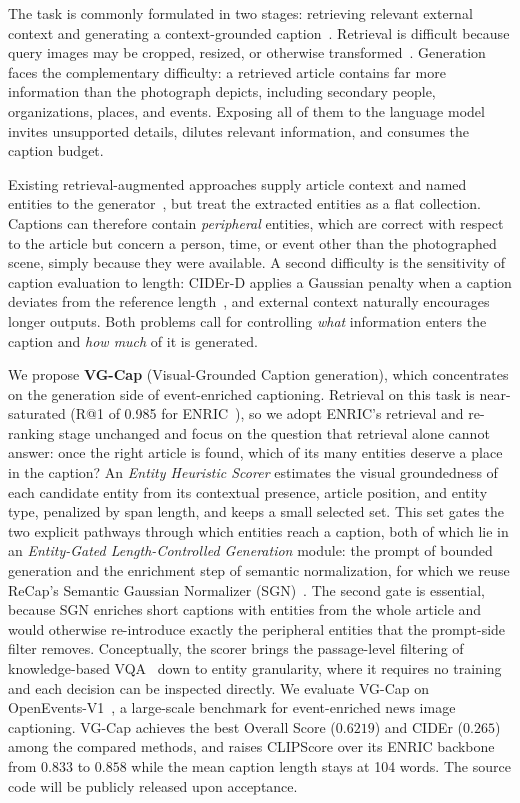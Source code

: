 \documentclass[runningheads]{llncs}
\DeclareRobustCommand{\aciids}[1]{{\color{olive}#1}}
\DeclareRobustCommand{\aciids}[1]{#1}
\begin{document}
The task is commonly formulated in two stages: retrieving relevant external context and generating a context-grounded caption~\cite{eventa_challenge}. Retrieval is difficult because query images may be cropped, resized, or otherwise transformed~\cite{nguyen2025openevents}. Generation faces the complementary difficulty: a retrieved article contains far more information than the photograph depicts, including secondary people, organizations, places, and events. Exposing all of them to the language model invites unsupported details, dilutes relevant information, and consumes the caption budget.

Existing retrieval-augmented approaches supply article context and named entities to the generator~\cite{enric,recap}, but treat the extracted entities as a flat collection. \aciids{Captions can therefore contain \emph{peripheral} entities, which are correct with respect to the article but concern a person, time, or event other than the photographed scene, simply because they were available.} A second difficulty is the sensitivity of caption evaluation to length: CIDEr-D applies a Gaussian penalty when a caption deviates from the reference length~\cite{vedantam2015cider}, and external context naturally encourages longer outputs. Both problems call for controlling \emph{what} information enters the caption and \emph{how much} of it is generated.

\aciids{We propose \textbf{VG-Cap} (Visual-Grounded Caption generation), which concentrates on the generation side of event-enriched captioning. Retrieval on this task is near-saturated (R@1 of 0.985 for ENRIC~\cite{enric}), so we adopt ENRIC's retrieval and re-ranking stage unchanged and focus on the question that retrieval alone cannot answer: once the right article is found, which of its many entities deserve a place in the caption? An \emph{Entity Heuristic Scorer} estimates the visual groundedness of each candidate entity from its contextual presence, article position, and entity type, penalized by span length, and keeps a small selected set. This set gates the two explicit pathways through which entities reach a caption, both of which lie in an \emph{Entity-Gated Length-Controlled Generation} module: the prompt of bounded generation and the enrichment step of semantic normalization, for which we reuse ReCap's Semantic Gaussian Normalizer (SGN)~\cite{recap}. The second gate is essential, because SGN enriches short captions with entities from the whole article and would otherwise re-introduce exactly the peripheral entities that the prompt-side filter removes. Conceptually, the scorer brings the passage-level filtering of knowledge-based VQA~\cite{gui2022kat,yan2024echosight,cocchi2025reflectiva} down to entity granularity, where it requires no training and each decision can be inspected directly.} \aciids{We evaluate VG-Cap on OpenEvents-V1~\cite{nguyen2025openevents}, a large-scale benchmark for event-enriched news image captioning. VG-Cap achieves the best Overall Score ($0.6219$) and CIDEr ($0.265$) among the compared methods, and raises CLIPScore over its ENRIC backbone from $0.833$ to $0.858$ while the mean caption length stays at 104 words. The source code will be publicly released upon acceptance.}
\end{document}
